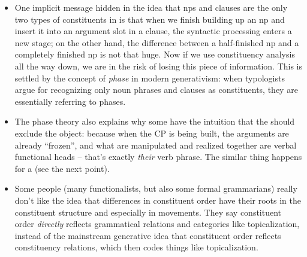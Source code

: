 {\begin{itemize}
        removing invisible functional projections, 
        replacing labels like SpecTP with ``subject'',
        using the term  to refer to the lexical head, etc.
        Thus, we are able to automatically 
        obtain more traditional constituency analysis (as in \citet{cgel})
        or dependency analysis 
        from generative trees. 
        The counterpart of c-command relations in the dependency analysis 
        is how ``tight'' a dependency relation is:
        that the relation between the verb and the object is tighter 
        than the relation between the verb and the subject 
        is equivalent to that the subject has a higher position in the syntactic tree.
    \item One implicit message hidden in the idea that 
        \acs{np}s and clauses are the only two types of constituents 
        in \citet{dixon2009basic1}  
        is that when we finish building up an \acs{np} 
        and insert it into an argument slot in a clause, 
        the syntactic processing enters a new stage;
        on the other hand, the difference between a half-finished \acs{np}
        and a completely finished \acs{np}
        is not that huge.
        Now if we use constituency analysis all the way down, 
        we are in the risk of losing this piece of information.
        This is settled by the concept of \emph{phase} in modern generativism:
        when typologists argue for recognizing only noun phrases and clauses as constituents, 
        they are essentially referring to phases. 
    \item The phase theory also explains why some have the intuition that 
        the  should exclude the object: 
        because when the CP is being built, 
        the arguments are already ``frozen'', 
        and what are manipulated and realized together 
        are verbal functional heads -- that's exactly \emph{their} verb phrase. 
        The similar thing happens for a  (see the next point). 
    \item Some people (many functionalists, but also some formal grammarians) 
        really don't like the idea that 
        differences in constituent order have their roots in 
        the constituent structure and especially in movements. 
        They say constituent order \emph{directly} reflects 
        grammatical relations and categories like topicalization, 
        instead of the mainstream generative idea that 
        constituent order reflects constituency relations,
        which then codes things like topicalization. 

\end{itemize}}
